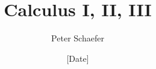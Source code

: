 

  
\title{Calculus I, II, III}
\author{Peter Schaefer}
\date{[Date]}



\maketitle
\tableofcontents
\newpage









